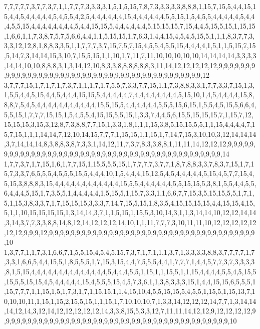7,7,7,7,7,3,7,7,3,7,1,1,7,7,7,3,3,3,3,1,5,1,5,15,7,8,7,3,3,3,3,3,8,8,8,1,15,7,15,5,4,4,15,15,4,4,5,4,4,4,4,4,5,4,5,5,4,2,5,4,4,4,4,4,4,15,4,4,4,4,4,4,5,5,15,1,5,4,5,5,4,4,4,4,4,5,4,4,4,5,5,15,4,4,4,4,4,4,4,4,5,4,4,15,15,5,4,4,4,4,4,4,5,15,15,15,7,15,4,4,5,15,5,15,1,15,15,1,6,6,1,1,7,3,8,7,5,7,5,6,6,4,4,1,1,5,15,15,1,7,6,3,1,4,4,15,4,5,4,5,15,5,1,1,1,8,3,7,7,3,3,3,12,12,8,1,8,8,3,3,5,1,1,7,7,7,3,7,15,7,5,7,15,4,5,5,4,5,5,15,4,4,4,4,1,5,1,1,5,15,7,15,5,14,7,3,14,14,15,3,10,7,15,5,15,1,1,10,1,7,11,7,11,10,10,10,10,10,14,14,14,14,3,3,3,3,14,14,10,10,8,8,8,3,1,3,14,12,10,8,3,3,8,8,8,8,8,8,3,11,14,12,12,12,12,12,9,9,9,9,9,9,9,9,9,9,9,9,9,9,9,9,9,9,9,9,9,9,9,9,9,9,9,9,9,9,9,9,9,9,9,9,9,9,9,9,9,9,9,12
3,7,7,7,15,1,7,1,7,1,7,3,7,1,1,1,7,1,7,5,5,7,3,3,7,7,15,1,1,7,3,8,8,3,3,1,7,7,3,3,7,15,1,3,1,5,5,4,4,5,15,4,4,5,4,4,4,15,15,5,4,4,4,4,4,7,4,4,4,4,4,4,4,4,5,15,10,1,4,5,4,4,4,4,15,8,8,8,7,5,4,5,4,4,4,4,4,4,4,4,4,4,4,15,5,15,5,4,4,4,4,4,4,5,5,5,15,6,15,1,5,5,4,5,15,5,6,6,4,5,5,15,1,7,7,7,15,15,1,5,4,5,5,4,15,15,5,5,15,1,3,3,7,4,4,5,6,15,5,15,15,15,7,1,15,7,12,15,15,15,3,15,3,12,8,7,3,8,8,7,7,15,1,3,3,1,8,1,1,1,15,3,8,5,15,15,5,5,1,1,15,4,4,4,4,7,15,7,15,1,1,1,14,14,7,12,10,14,15,7,7,7,1,15,15,1,1,15,1,7,14,7,15,3,10,10,3,12,14,14,14,3,7,14,14,14,8,3,8,8,3,8,7,3,3,1,14,12,11,7,3,7,8,3,3,8,8,1,11,11,14,12,12,12,9,9,9,9,9,9,9,9,9,9,9,9,9,9,9,9,9,9,9,9,9,9,9,9,9,9,9,9,9,9,9,9,9,9,9,9,9,9,9,9,9,9,9,9,9,14
1,7,7,3,7,1,7,15,1,6,1,7,7,15,1,15,5,5,5,15,1,7,7,7,7,3,7,7,1,8,7,8,8,3,3,7,8,3,7,15,1,7,15,7,3,3,7,6,5,5,5,4,5,5,5,15,5,4,4,4,10,1,5,4,4,4,15,12,5,4,5,4,4,4,4,4,5,15,4,5,7,7,15,4,5,15,3,8,8,8,3,15,4,4,4,4,4,4,4,4,4,4,4,4,15,5,5,4,4,4,4,4,4,5,5,15,15,5,3,8,1,5,5,4,4,5,5,6,4,4,4,5,15,1,7,3,5,5,1,4,4,4,4,4,1,5,15,5,1,15,7,3,3,1,1,6,6,7,7,15,3,5,15,15,5,5,1,7,1,5,1,15,3,8,3,3,7,1,7,15,15,15,3,3,3,7,14,7,15,5,15,1,8,3,5,4,15,15,15,15,4,4,15,15,4,15,5,1,1,10,15,15,15,15,1,3,14,14,3,7,1,1,5,15,1,15,5,3,10,14,3,1,1,3,14,14,10,12,12,14,14,3,14,3,7,7,3,3,8,8,14,8,12,14,12,12,12,14,10,1,1,11,7,7,7,3,10,11,11,10,12,12,12,12,12,12,12,9,9,9,12,9,9,9,9,9,9,9,9,9,9,9,9,9,9,9,9,9,9,9,9,9,9,9,9,9,9,9,9,9,9,9,9,9,9,9,9,9,9,10
1,3,7,7,1,1,7,3,1,6,6,7,1,5,5,15,4,5,4,5,15,7,3,7,1,7,1,1,1,3,7,1,3,3,3,3,8,8,3,7,7,7,7,1,7,3,3,1,6,6,5,4,4,15,5,1,8,5,5,5,1,7,15,3,15,4,4,7,5,5,5,4,4,1,7,7,7,1,4,4,5,7,7,3,7,3,3,3,3,8,1,5,15,4,4,4,4,4,4,4,4,4,4,4,4,4,4,5,4,4,4,5,5,1,15,1,1,15,5,1,1,15,4,4,4,4,5,5,4,5,15,5,15,5,5,15,15,4,5,4,4,4,4,4,15,4,5,5,5,15,4,5,7,3,6,1,1,3,8,3,3,3,15,1,4,4,15,15,6,5,5,5,1,15,7,7,7,1,1,15,1,5,1,7,3,1,7,1,15,15,1,1,4,15,10,4,5,5,15,15,5,4,5,5,1,15,5,1,15,13,7,10,10,10,11,1,15,1,15,2,15,5,15,1,1,15,1,7,10,10,10,7,1,3,3,14,12,12,12,14,7,7,1,3,14,14,14,12,14,3,12,14,12,12,12,12,12,14,3,3,8,15,5,3,3,12,7,11,11,14,12,12,9,12,12,12,12,9,9,9,9,9,9,9,9,9,9,9,9,9,9,9,9,9,9,9,9,9,9,9,9,9,9,9,9,9,9,9,9,9,9,9,9,9,9,9,9,9,9,10
